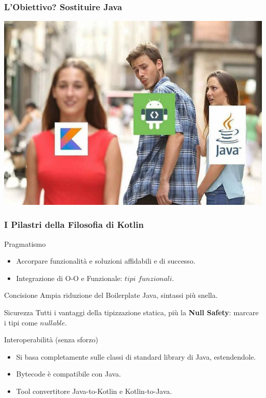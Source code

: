     \begin{frame}
      \frametitle{L'Obiettivo? Sostituire Java}
      \begin{center}
        \includegraphics[scale=0.33]{img/KotlinMeme}
      \end{center}
    \end{frame}

    \begin{frame}
      \frametitle{I Pilastri della Filosofia di Kotlin}
      \begin{block}{Pragmatismo}
        \begin{itemize}
          \item Accorpare funzionalità e soluzioni affidabili e di successo.
          \item Integrazione di O-O e Funzionale: $tipi$ $funzionali$.
        \end{itemize}
      \end{block}
      \begin{block}{Concisione}
        Ampia riduzione del Boilerplate Java, sintassi più snella.
      \end{block}
      \begin{block}{Sicurezza}
        Tutti i vantaggi della tipizzazione statica, più la \textbf{\alert{Null Safety}}: marcare i tipi come $nullable$.
      \end{block}
      \begin{block}{Interoperabilità (senza sforzo)}
        \begin{itemize}
          \item Si basa completamente sulle classi di standard library di Java, estendendole.
          \item Bytecode è compatibile con Java.
          \item Tool convertitore Java-to-Kotlin e Kotlin-to-Java.
        \end{itemize}
      \end{block}
    \end{frame}

